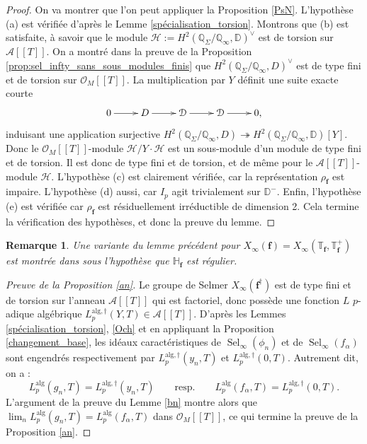 \documentclass[12pt]{amsart}
\newcommand\bD{\mathbb{D}}
\newcommand\bQ{\mathbb{Q}}
\newcommand\bH{\mathbb{H}}
\newcommand\bT{\mathbb{T}}
\newcommand\cA{\mathcal{A}}
\newcommand\cD{\mathcal{D}}
\newcommand\cH{\mathcal{H}}
\newcommand\cO{\mathcal{O}}
\newcommand{\alg}{\textrm{alg}}
\DeclareMathOperator{\Sel}{Sel}
\theoremstyle{defstyle}
\newtheorem{remarque}[subsubsection]{Remarque}
\theoremstyle{thmstyle}
\begin{document}
\begin{proof}
	On va montrer que l'on peut appliquer la Proposition \ref{PsN}. L'hypothèse (a) est vérifiée d'après le Lemme \ref{spécialisation_torsion}. Montrons que (b) est satisfaite, à savoir que le module $\cH:=H^2(\bQ_\Sigma/\bQ_\infty,\bD)^\vee$ est de torsion sur $\cA[[T]]$. On a montré dans la preuve de la Proposition \ref{prop:sel_infty_sans_sous_modules_finis} que $H^2(\bQ_\Sigma/\bQ_\infty,D)^\vee$ est de type fini et de torsion sur $\cO_M[[T]]$. La multiplication par $Y$ définit une suite exacte courte 
	$$\xymatrix{ 0 \ar[r] & D \ar[r] & \cD \ar[r] & \cD \ar[r] &  0, }$$
	induisant une application surjective $H^2(\bQ_\Sigma/\bQ_\infty,D) \twoheadrightarrow H^2(\bQ_\Sigma/\bQ_\infty,\bD)[Y]$. Donc le $\cO_M[[T]]$-module $\cH/Y\cdot\cH$ est un sous-module d'un module de type fini et de torsion. Il est donc de type fini et de torsion, et de même pour le $\cA[[T]]$-module $\cH$. L'hypothèse (c) est clairement vérifiée, car la représentation $\rho_\textbf{f}$ est impaire. L'hypothèse (d) aussi, car $I_p$ agit trivialement sur $\bD^-$. Enfin, l'hypothèse (e) est vérifiée car $\rho_\textbf{f}$ est résiduellement irréductible de dimension 2. Cela termine la vérification des hypothèses, et donc la preuve du lemme.
\end{proof}
\begin{remarque}
	Une variante du lemme précédent pour $X_\infty(\textbf{f})=X_\infty(\bT_\textbf{f},\bT_\textbf{f}^+)$ est montrée dans \cite[Proposition 8.1]{ochiai2006two} sous l'hypothèse que $\bH_\textbf{f}$ est régulier.
\end{remarque}
\begin{proof}[Preuve de la Proposition \ref{an}]
	Le groupe de Selmer $X_\infty(\textbf{f}^\dag)$ est de type fini et de torsion sur l'anneau $\cA[[T]]$ qui est factoriel, donc possède une fonction $L$ $p$-adique algébrique $L_p^{\alg,\dag}(Y,T) \in \cA[[T]]$. D'après les Lemmes \ref{spécialisation_torsion}, \ref{Och} et en appliquant la Proposition \ref{changement_base}, les idéaux caractéristiques de $\Sel_\infty(\phi_n)$ et de $\Sel_\infty(f_\alpha)$ sont engendrés respectivement par $L^{\alg,\dag}_p(y_n,T)$ et $L_p^{\alg,\dag}(0,T)$. Autrement dit, on a :
	$$ L_p^{\alg}(g_n,T) = L^{\alg,\dag}_p(y_n,T) \qquad \textrm{resp.} \qquad L_p^{\alg}(f_\alpha,T)=L^{\alg,\dag}_p(0,T).$$
	L'argument de la preuve du Lemme \ref{bn} montre alors que $\lim_{n}L_p^{\alg}(g_n,T) = L_p^{\alg}(f_\alpha,T)$ dans $\cO_M[[T]]$, ce qui termine la preuve de la Proposition \ref{an}.
\end{proof}

	
	
	
\end{document}
